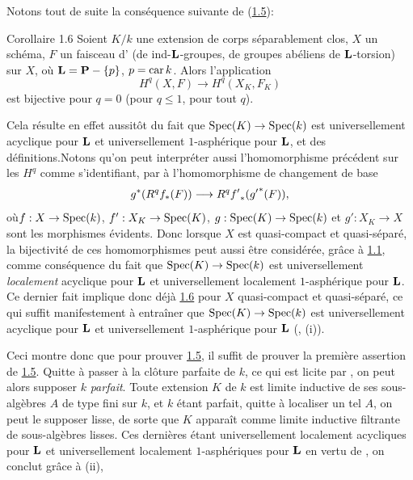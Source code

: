 \documentclass[10pt]{../fichiers-configuration-latex/smfart}
\begin{document}
Notons tout de suite la conséquence suivante de (\hyperref[XVI.cor1.5]{1.5}):

\begin{enonce*}{Corollaire 1.6}
Soient $K/k$ une extension de corps séparablement clos, $X$ un schéma,
$F$ un faisceau d' (\resp de ind-$\mathbf{L}$-groupes, \resp
de groupes abéliens de $\mathbf{L}$-torsion) sur $X$, où
$\mathbf{L}=\mathbf{P}-\{p\}$, $p=\operatorname{car} k$. Alors l'application
$$
H^{q}(X,F)\longrightarrow H^{q}(X_{K},F_{K})
$$
est bijective pour $q=0$ (\resp pour $q\leq 1$, \resp pour tout $q$).
\end{enonce*}

Cela résulte en effet aussitôt du fait que $\operatorname{Spec}(K)\rightarrow
\operatorname{Spec}(k)$ est universellement acyclique pour $\mathbf{L}$ et
universellement $1$-asphérique pour $\mathbf{L}$, et des
définitions.\sisi{---~}{~}Notons qu'on peut interpréter aussi l'homomorphisme
précédent sur les $H^{q}$ comme s'identifiant, par \sisi{}{,}
à l'homomorphisme de changement de base
$$
g^{\ast}(R^{q}f_{\ast}(F))\longrightarrow
R^{q}{f'}_{\ast}({g'}^{\ast}(F)){},
$$
où\pageoriginale $f:X\rightarrow \operatorname{Spec}(k)$, $f':X_K\rightarrow
\operatorname{Spec}(K)$, $g:\operatorname{Spec}(K)\rightarrow \operatorname{Spec}(k)$ et $g':X_K\rightarrow X$
sont les morphismes évidents. Donc lorsque $X$ est quasi-compact et
quasi-séparé, la bijectivité de ces homomorphismes peut aussi être
considérée, grâce à \hyperref[XVI.thm1.1]{1.1}, comme conséquence du fait que
$\operatorname{Spec}(K)\rightarrow \operatorname{Spec}(k)$ est universellement \emph{localement}
acyclique pour $\mathbf{L}$ et universellement localement
$1$-asphérique pour $\mathbf{L}$. Ce dernier fait implique donc déjà
\hyperref[XVI.cor1.6]{1.6} pour $X$ quasi-compact et quasi-séparé, ce qui suffit
manifestement à entraîner que $\operatorname{Spec} (K)\rightarrow \operatorname{Spec}(k)$ est
universellement acyclique pour $\mathbf{L}$ et universellement
$1$-asphérique pour $\mathbf{L}$ (,  (i)).

Ceci montre donc que pour prouver \hyperref[XVI.cor1.5]{1.5}, il suffit de prouver la
première assertion de \hyperref[XVI.cor1.5]{1.5}. Quitte à passer à la clôture parfaite de
$k$, ce qui est licite par ,
on peut alors supposer $k$ \emph{parfait}. Toute extension $K$ de $k$ est limite inductive de ses
sous-algèbres $A$ de type fini sur $k$, et $k$ étant parfait, quitte à
localiser un tel $A$, on peut le supposer lisse, de sorte que $K$
apparaît comme limite inductive filtrante de sous-algèbres lisses. Ces
dernières étant universellement localement acycliques pour
$\mathbf{L}$ et universellement localement $1$-asphériques pour
$\mathbf{L}$ en vertu de , on conclut grâce à  (ii),
\cqfd
\end{document}
